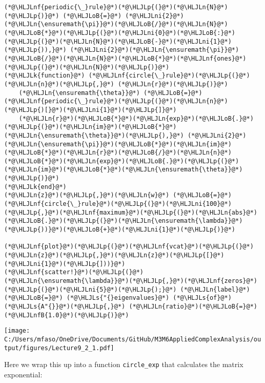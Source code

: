 \documentclass[12pt,a4paper]{article}
\newcommand{\HLJLk}[1]{\textcolor[RGB]{148,91,176}{\textbf{#1}}}
\newcommand{\HLJLn}[1]{#1}
\newcommand{\HLJLnf}[1]{\textcolor[RGB]{66,102,213}{#1}}
\newcommand{\HLJLs}[1]{\textcolor[RGB]{201,61,57}{#1}}
\newcommand{\HLJLnfB}[1]{\textcolor[RGB]{59,151,46}{#1}}
\newcommand{\HLJLni}[1]{\textcolor[RGB]{59,151,46}{#1}}
\newcommand{\HLJLoB}[1]{\textcolor[RGB]{102,102,102}{\textbf{#1}}}
\newcommand{\HLJLp}[1]{#1}
\begin{document}
\begin{lstlisting}
(*@\HLJLnf{periodic{\_}rule}@*)(*@\HLJLp{(}@*)(*@\HLJLn{N}@*)(*@\HLJLp{)}@*) (*@\HLJLoB{=}@*) (*@\HLJLni{2}@*)(*@\HLJLn{\ensuremath{\pi}}@*)(*@\HLJLoB{/}@*)(*@\HLJLn{N}@*)(*@\HLJLoB{*}@*)(*@\HLJLp{(}@*)(*@\HLJLni{0}@*)(*@\HLJLoB{:}@*)(*@\HLJLp{(}@*)(*@\HLJLn{N}@*)(*@\HLJLoB{-}@*)(*@\HLJLni{1}@*)(*@\HLJLp{)),}@*) (*@\HLJLni{2}@*)(*@\HLJLn{\ensuremath{\pi}}@*)(*@\HLJLoB{/}@*)(*@\HLJLn{N}@*)(*@\HLJLoB{*}@*)(*@\HLJLnf{ones}@*)(*@\HLJLp{(}@*)(*@\HLJLn{N}@*)(*@\HLJLp{)}@*)
(*@\HLJLk{function}@*) (*@\HLJLnf{circle{\_}rule}@*)(*@\HLJLp{(}@*)(*@\HLJLn{n}@*)(*@\HLJLp{,}@*) (*@\HLJLn{r}@*)(*@\HLJLp{)}@*)
    (*@\HLJLn{\ensuremath{\theta}}@*) (*@\HLJLoB{=}@*) (*@\HLJLnf{periodic{\_}rule}@*)(*@\HLJLp{(}@*)(*@\HLJLn{n}@*)(*@\HLJLp{)[}@*)(*@\HLJLni{1}@*)(*@\HLJLp{]}@*)
    (*@\HLJLn{r}@*)(*@\HLJLoB{*}@*)(*@\HLJLn{exp}@*)(*@\HLJLoB{.}@*)(*@\HLJLp{(}@*)(*@\HLJLn{im}@*)(*@\HLJLoB{*}@*)(*@\HLJLn{\ensuremath{\theta}}@*)(*@\HLJLp{),}@*) (*@\HLJLni{2}@*)(*@\HLJLn{\ensuremath{\pi}}@*)(*@\HLJLoB{*}@*)(*@\HLJLn{im}@*)(*@\HLJLoB{*}@*)(*@\HLJLn{r}@*)(*@\HLJLoB{/}@*)(*@\HLJLn{n}@*)(*@\HLJLoB{*}@*)(*@\HLJLn{exp}@*)(*@\HLJLoB{.}@*)(*@\HLJLp{(}@*)(*@\HLJLn{im}@*)(*@\HLJLoB{*}@*)(*@\HLJLn{\ensuremath{\theta}}@*)(*@\HLJLp{)}@*)
(*@\HLJLk{end}@*)
(*@\HLJLn{z}@*)(*@\HLJLp{,}@*)(*@\HLJLn{w}@*) (*@\HLJLoB{=}@*) (*@\HLJLnf{circle{\_}rule}@*)(*@\HLJLp{(}@*)(*@\HLJLni{100}@*)(*@\HLJLp{,}@*)(*@\HLJLnf{maximum}@*)(*@\HLJLp{(}@*)(*@\HLJLn{abs}@*)(*@\HLJLoB{.}@*)(*@\HLJLp{(}@*)(*@\HLJLn{\ensuremath{\lambda}}@*)(*@\HLJLp{))}@*)(*@\HLJLoB{+}@*)(*@\HLJLni{1}@*)(*@\HLJLp{)}@*)

(*@\HLJLnf{plot}@*)(*@\HLJLp{(}@*)(*@\HLJLnf{vcat}@*)(*@\HLJLp{(}@*)(*@\HLJLn{z}@*)(*@\HLJLp{,}@*)(*@\HLJLn{z}@*)(*@\HLJLp{[}@*)(*@\HLJLni{1}@*)(*@\HLJLp{]))}@*)
(*@\HLJLnf{scatter!}@*)(*@\HLJLp{(}@*)(*@\HLJLn{\ensuremath{\lambda}}@*)(*@\HLJLp{,}@*)(*@\HLJLnf{zeros}@*)(*@\HLJLp{(}@*)(*@\HLJLni{5}@*)(*@\HLJLp{);}@*) (*@\HLJLn{label}@*) (*@\HLJLoB{=}@*) (*@\HLJLs{"{}eigenvalues}@*) (*@\HLJLs{of}@*) (*@\HLJLs{A"{}}@*)(*@\HLJLp{,}@*) (*@\HLJLn{ratio}@*)(*@\HLJLoB{=}@*)(*@\HLJLnfB{1.0}@*)(*@\HLJLp{)}@*)
\end{lstlisting}

\texttt{[image: C:/Users/mfaso/OneDrive/Documents/GitHub/M3M6AppliedComplexAnalysis/output/figures/Lecture9\_2\_1.pdf]}

Here we wrap this up into a function \texttt{circle\_exp} that calculates the matrix exponential:
\end{document}
